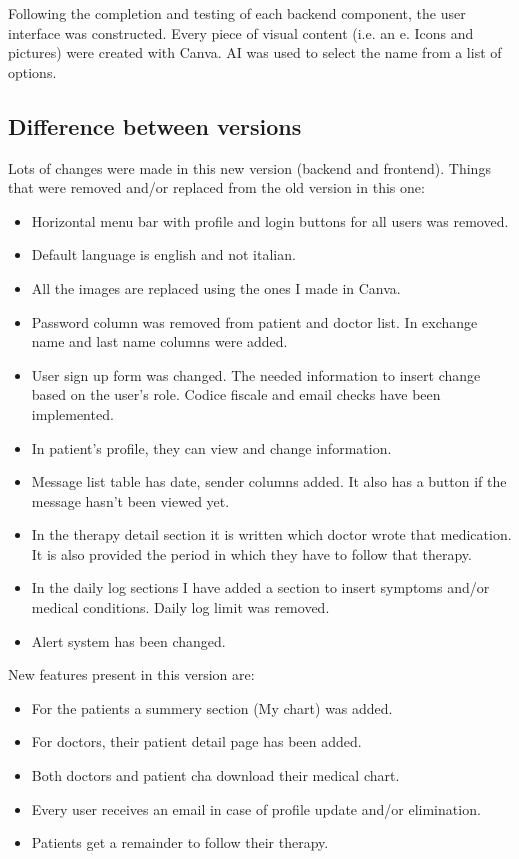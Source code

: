 \documentclass[10pt, titlepage]{article}
\begin{document}
    Following the completion and testing of each backend component, the user interface was constructed. Every piece of visual content (i.e. an e. Icons and pictures) were created with Canva. AI was used to select the name from a list of options.

    \subsection{Difference between versions}
    Lots of changes were made in this new version (backend and frontend). Things that were removed and/or replaced from the old version in this one:
    \begin{itemize}
        \item Horizontal menu bar with profile and login buttons for all users was removed.
        \item Default language is english and not italian.
        \item All the images are replaced using the ones I made in Canva.
        \item Password column was removed from patient and doctor list. In exchange name and last name columns were added.
        \item User sign up form was changed. The needed information to insert change based on the user's role. Codice fiscale and email checks have been implemented.
        \item In patient's profile, they can view and change information.
        \item Message list table has date, sender columns added. It also has a button if the message hasn't been viewed yet.
        \item In the therapy detail section it is written which doctor wrote that medication. It is also provided the period in which they have to follow that therapy.
        \item In the daily log sections I have added a section to insert symptoms and/or medical conditions. Daily log limit was removed.
        \item Alert system has been changed.
    \end{itemize}
    New features present in this version are:
    \begin{itemize}
        \item For the patients a summery section (My chart) was added.
        \item For doctors, their patient detail page has been added.
        \item Both doctors and patient cha download their medical chart.
        \item Every user receives an email in case of profile update and/or elimination.
        \item Patients get a remainder to follow their therapy.
    \end{itemize}
    
\end{document}

